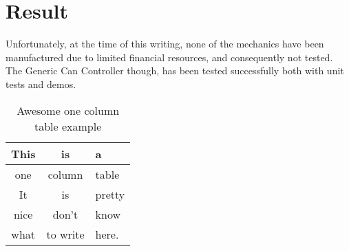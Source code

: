 \section{Result}\label{sec:result}
Unfortunately, at the time of this writing, none of the mechanics have been manufactured due to limited financial resources, and consequently not tested. The Generic Can Controller though, has been tested successfully both with unit tests and demos.

\begin{table}
\centering
    \caption{Awesome one column table example}
    \begin{tabular}{|c|c|l|} \hline
    \label{table:one_column}
        This & is & a \\ \hline
        one & column & table\\ \hline
        It & is & pretty \\ \hline
        nice & don't & know \\ \hline
        what & to write & here.\\
        \hline
    \end{tabular}
\end{table}

